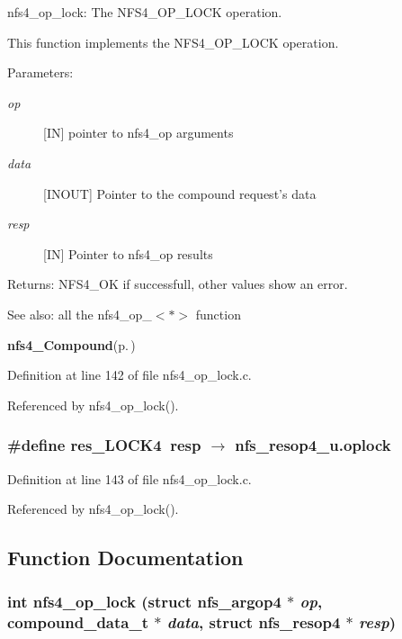 nfs4\_\-op\_\-lock: The NFS4\_\-OP\_\-LOCK operation.

This function implements the NFS4\_\-OP\_\-LOCK operation.

\begin{Desc}
\item[Parameters:]
\begin{description}
\item[{\em op}][IN] pointer to nfs4\_\-op arguments \item[{\em data}][INOUT] Pointer to the compound request's data \item[{\em resp}][IN] Pointer to nfs4\_\-op results\end{description}
\end{Desc}
\begin{Desc}
\item[Returns:]NFS4\_\-OK if successfull, other values show an error.\end{Desc}
\begin{Desc}
\item[See also:]all the nfs4\_\-op\_\-$<$$\ast$$>$ function 

{\bf nfs4\_\-Compound}{\rm (p.\,\pageref{nfs4__Compound_8c_a4})} \end{Desc}


Definition at line 142 of file nfs4\_\-op\_\-lock.c.

Referenced by nfs4\_\-op\_\-lock().
\subsubsection{\setlength{\rightskip}{0pt plus 5cm}\#define res\_\-LOCK4\ resp $\rightarrow$ nfs\_\-resop4\_\-u.oplock}\label{nfs4__op__lock_8c_a1}




Definition at line 143 of file nfs4\_\-op\_\-lock.c.

Referenced by nfs4\_\-op\_\-lock().

\subsection{Function Documentation}
\subsubsection{\setlength{\rightskip}{0pt plus 5cm}int nfs4\_\-op\_\-lock (struct nfs\_\-argop4 $\ast$ {\em op}, compound\_\-data\_\-t $\ast$ {\em data}, struct nfs\_\-resop4 $\ast$ {\em resp})}\label{nfs4__op__lock_8c_a2}




